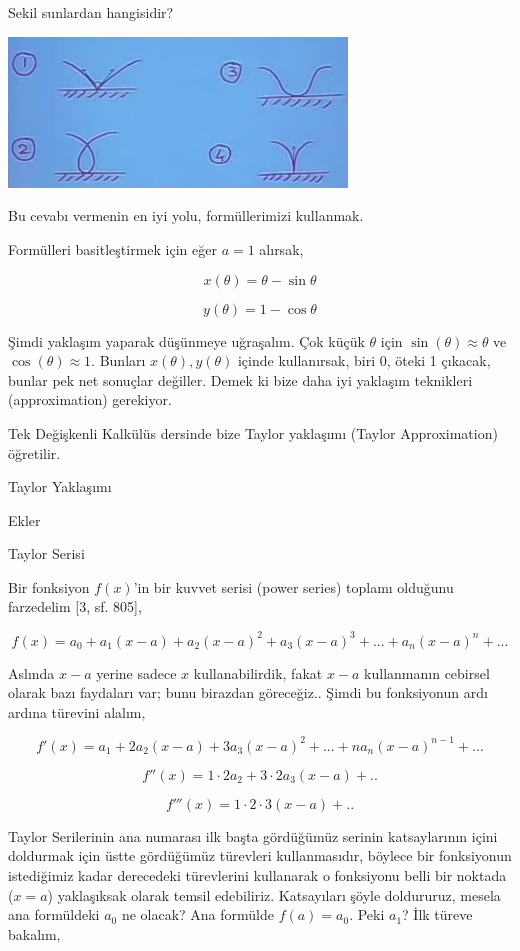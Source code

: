 \documentclass[12pt,fleqn]{article}\usepackage{../../common}
\begin{document}
Sekil sunlardan hangisidir? 

\begin{center}
\includegraphics[height=4cm]{5_8.png}
\end{center}

Bu cevabı vermenin en iyi yolu, formüllerimizi kullanmak. 

Formülleri basitleştirmek için eğer $a=1$ alırsak, 

$$ x(\theta) = \theta - \sin \theta $$

$$ y(\theta) = 1 - \cos \theta $$

Şimdi yaklaşım yaparak düşünmeye uğraşalım. Çok küçük $\theta$ için
$\sin(\theta) \approx \theta$ ve $\cos(\theta) \approx 1$. Bunları $x(\theta),
y(\theta)$ içinde kullanırsak, biri 0, öteki 1 çıkacak, bunlar pek net sonuçlar
değiller. Demek ki bize daha iyi yaklaşım teknikleri (approximation) gerekiyor.

Tek Değişkenli Kalkülüs dersinde bize Taylor yaklaşımı (Taylor Approximation) 
öğretilir. 

Taylor Yaklaşımı

Ekler

Taylor Serisi

Bir fonksiyon $f(x)$'in bir kuvvet serisi (power series) toplamı olduğunu
farzedelim [3, sf. 805], 

$$ f(x) = a_0 + a_1(x-a) + a_2(x-a)^2 + a_3(x-a)^3 + ... + a_n (x-a)^n + ...$$

Aslında $x-a$ yerine sadece $x$ kullanabilirdik, fakat $x-a$ kullanmanın
cebirsel olarak bazı faydaları var; bunu birazdan göreceğiz.. Şimdi bu
fonksiyonun ardı ardına türevini alalım,

$$ f'(x) = a_1 +  2a_2(x-a) + 3a_3(x-a)^2 + ... + n a_n(x-a)^{n-1} + ...$$

$$ f''(x) = 1 \cdot 2a_2 + 3 \cdot 2a_3(x-a) + .. $$

$$ f'''(x) =  1 \cdot 2 \cdot 3 (x-a) + .. $$


Taylor Serilerinin ana numarası ilk başta gördüğümüz serinin katsaylarının
içini doldurmak için üstte gördüğümüz türevleri kullanmasıdır, böylece bir
fonksiyonun istediğimiz kadar derecedeki türevlerini kullanarak o
fonksiyonu belli bir noktada ($x=a$) yaklaşıksak olarak temsil
edebiliriz. Katsayıları şöyle doldururuz, mesela ana formüldeki $a_0$ ne
olacak? Ana formülde $f(a)=a_0$. Peki $a_1$? İlk türeve bakalım, 
\end{document}
